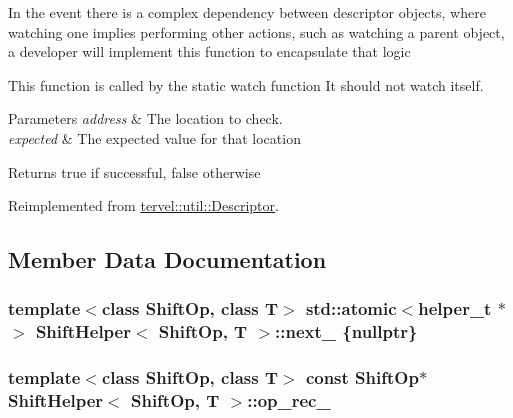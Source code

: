 In the event there is a complex dependency between descriptor objects, where watching one implies performing other actions, such as watching a parent object, a developer will implement this function to encapsulate that logic

This function is called by the static watch function It should not watch itself.


\begin{DoxyParams}{Parameters}
{\em address} & The location to check. \\
\hline
{\em expected} & The expected value for that location\\
\hline
\end{DoxyParams}
\begin{DoxyReturn}{Returns}
true if successful, false otherwise 
\end{DoxyReturn}


Reimplemented from \hyperlink{classtervel_1_1util_1_1_descriptor_ab643e09f20f35149dc820766b0f9ccdb}{tervel\+::util\+::\+Descriptor}.



\subsection{Member Data Documentation}
\hypertarget{class_shift_helper_a04a511ddc0133148d98c38cad0a73e16}{}
\subsubsection[{next\+\_\+}]{\setlength{\rightskip}{0pt plus 5cm}template$<$class Shift\+Op, class T$>$ std\+::atomic$<${\bf helper\+\_\+t} $\ast$$>$ {\bf Shift\+Helper}$<$ Shift\+Op, T $>$\+::next\+\_\+ \{nullptr\}}\label{class_shift_helper_a04a511ddc0133148d98c38cad0a73e16}
\hypertarget{class_shift_helper_aed2e1221ed06fb90eb37979339229ef9}{}
\subsubsection[{op\+\_\+rec\+\_\+}]{\setlength{\rightskip}{0pt plus 5cm}template$<$class Shift\+Op, class T$>$ const Shift\+Op$\ast$ {\bf Shift\+Helper}$<$ Shift\+Op, T $>$\+::op\+\_\+rec\+\_\+}\label{class_shift_helper_aed2e1221ed06fb90eb37979339229ef9}
\hypertarget{class_shift_helper_a78998ae32b1b34120e66ab954a5faeca}{}
